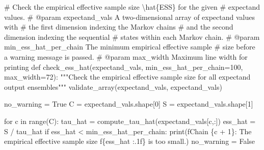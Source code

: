\documentclass[
  letterpaper,
  DIV=11,
  numbers=noendperiod]{scrartcl}
\newenvironment{Shaded}{\begin{snugshade}}{\end{snugshade}}
\newcommand{\BuiltInTok}[1]{\textcolor[rgb]{0.00,0.23,0.31}{#1}}
\newcommand{\CommentTok}[1]{\textcolor[rgb]{0.37,0.37,0.37}{#1}}
\newcommand{\ControlFlowTok}[1]{\textcolor[rgb]{0.00,0.23,0.31}{#1}}
\newcommand{\DecValTok}[1]{\textcolor[rgb]{0.68,0.00,0.00}{#1}}
\newcommand{\KeywordTok}[1]{\textcolor[rgb]{0.00,0.23,0.31}{#1}}
\newcommand{\NormalTok}[1]{\textcolor[rgb]{0.00,0.23,0.31}{#1}}
\newcommand{\OperatorTok}[1]{\textcolor[rgb]{0.37,0.37,0.37}{#1}}
\newcommand{\SpecialCharTok}[1]{\textcolor[rgb]{0.37,0.37,0.37}{#1}}
\newcommand{\SpecialStringTok}[1]{\textcolor[rgb]{0.13,0.47,0.30}{#1}}
\newcommand{\StringTok}[1]{\textcolor[rgb]{0.13,0.47,0.30}{#1}}
\newcommand{\VariableTok}[1]{\textcolor[rgb]{0.07,0.07,0.07}{#1}}
\begin{document}
\begin{Shaded}
\begin{Highlighting}[]
\CommentTok{\# Check the empirical effective sample size \textbackslash{}hat\{ESS\} for the given}
\CommentTok{\# expectand values.}
\CommentTok{\# @param expectand\_vals A two{-}dimensional array of expectand values with}
\CommentTok{\#                       the first dimension indexing the Markov chains}
\CommentTok{\#                       and the second dimension indexing the sequential}
\CommentTok{\#                       states within each Markov chain.}
\CommentTok{\# @param min\_ess\_hat\_per\_chain The minimum empirical effective sample}
\CommentTok{\#                              size before a warning message is passed.}
\CommentTok{\# @param max\_width Maximum line width for printing}
\KeywordTok{def}\NormalTok{ check\_ess\_hat(expectand\_vals,}
\NormalTok{                  min\_ess\_hat\_per\_chain}\OperatorTok{=}\DecValTok{100}\NormalTok{,}
\NormalTok{                  max\_width}\OperatorTok{=}\DecValTok{72}\NormalTok{):}
  \CommentTok{"""Check the empirical effective sample size for all expectand }
\CommentTok{     output ensembles"""}
\NormalTok{  validate\_array(expectand\_vals, }\StringTok{\textquotesingle{}expectand\_vals\textquotesingle{}}\NormalTok{)}
  
\NormalTok{  no\_warning }\OperatorTok{=} \VariableTok{True}
\NormalTok{  C }\OperatorTok{=}\NormalTok{ expectand\_vals.shape[}\DecValTok{0}\NormalTok{]}
\NormalTok{  S }\OperatorTok{=}\NormalTok{ expectand\_vals.shape[}\DecValTok{1}\NormalTok{]}
  
  \ControlFlowTok{for}\NormalTok{ c }\KeywordTok{in} \BuiltInTok{range}\NormalTok{(C):}
\NormalTok{    tau\_hat }\OperatorTok{=}\NormalTok{ compute\_tau\_hat(expectand\_vals[c,:])}
\NormalTok{    ess\_hat }\OperatorTok{=}\NormalTok{ S }\OperatorTok{/}\NormalTok{ tau\_hat}
    \ControlFlowTok{if}\NormalTok{ ess\_hat }\OperatorTok{\textless{}}\NormalTok{ min\_ess\_hat\_per\_chain:}
      \BuiltInTok{print}\NormalTok{(}\SpecialStringTok{f\textquotesingle{}Chain }\SpecialCharTok{\{}\NormalTok{c }\OperatorTok{+} \DecValTok{1}\SpecialCharTok{\}}\SpecialStringTok{: The empirical effective sample size \textquotesingle{}}
            \SpecialStringTok{f\textquotesingle{}}\SpecialCharTok{\{}\NormalTok{ess\_hat }\SpecialCharTok{:.1f\}}\SpecialStringTok{ is too small.\textquotesingle{}}\NormalTok{)}
\NormalTok{      no\_warning }\OperatorTok{=} \VariableTok{False}
  

\end{Highlighting}
\end{Shaded}
\end{document}
